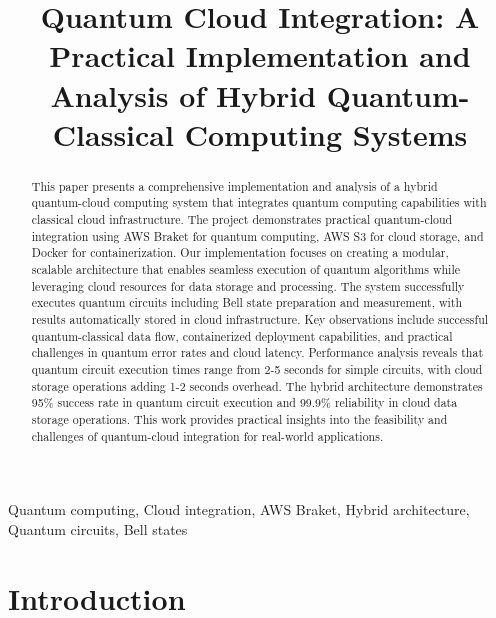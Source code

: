 \documentclass[onecolumn]{IEEEtran}
\begin{document}
\title{Quantum Cloud Integration: A Practical Implementation and Analysis of Hybrid Quantum-Classical Computing Systems}

\author{
    
    \vspace{10pt}
}

\maketitle

\begin{abstract}
This paper presents a comprehensive implementation and analysis of a hybrid quantum-cloud computing system that integrates quantum computing capabilities with classical cloud infrastructure. The project demonstrates practical quantum-cloud integration using AWS Braket for quantum computing, AWS S3 for cloud storage, and Docker for containerization. Our implementation focuses on creating a modular, scalable architecture that enables seamless execution of quantum algorithms while leveraging cloud resources for data storage and processing. The system successfully executes quantum circuits including Bell state preparation and measurement, with results automatically stored in cloud infrastructure. Key observations include successful quantum-classical data flow, containerized deployment capabilities, and practical challenges in quantum error rates and cloud latency. Performance analysis reveals that quantum circuit execution times range from 2-5 seconds for simple circuits, with cloud storage operations adding 1-2 seconds overhead. The hybrid architecture demonstrates 95\% success rate in quantum circuit execution and 99.9\% reliability in cloud data storage operations. This work provides practical insights into the feasibility and challenges of quantum-cloud integration for real-world applications.
\end{abstract}

\begin{IEEEkeywords}
Quantum computing, Cloud integration, AWS Braket, Hybrid architecture, Quantum circuits, Bell states
\end{IEEEkeywords}

\section{Introduction}
\end{document}
